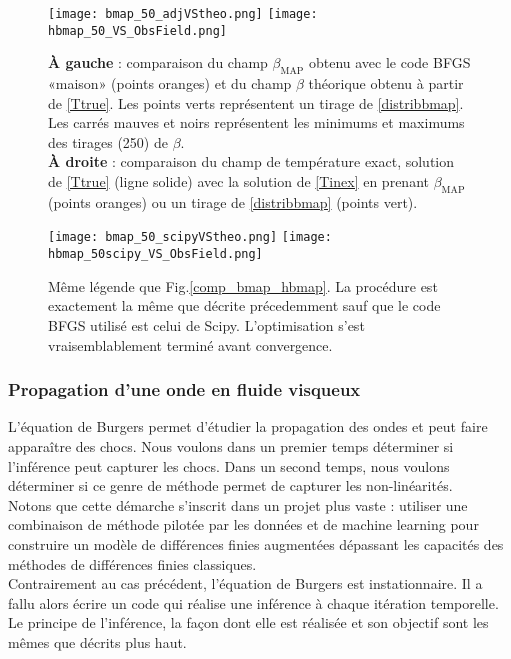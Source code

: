 \documentclass[a4paper,12pt]{article}
\newcommand{\bmap}{\beta_{\text{MAP}}}
\newcommand\bk{\color{black}}
\newcommand\dsb{\color{dsb}}
\numberwithin{equation}{section} %
\begin{document}
\begin{figure}[!ht]
\centering
\texttt{[image: bmap\_50\_adjVStheo.png]} \hfill
\texttt{[image: hbmap\_50\_VS\_ObsField.png]}
\caption{\small{\textbf{À gauche} : comparaison du champ $\bmap$ obtenu avec le code BFGS «maison» (points oranges) et du champ $\beta$ théorique obtenu à partir de \eqref{Ttrue}. Les points verts représentent un tirage de \eqref{distribbmap}. Les carrés mauves et noirs représentent les minimums et maximums des tirages (250) de $\beta$. \\ \textbf{À droite} : comparaison du champ de température exact, solution de \eqref{Ttrue} (ligne solide) avec la solution de \eqref{Tinex} en prenant $\bmap$ (points oranges) ou un tirage de \eqref{distribbmap} (points vert).}}
\label{comp_bmap_hbmap}
\end{figure}

\begin{figure}[!ht]
\centering
\texttt{[image: bmap\_50\_scipyVStheo.png]} \hfill
\texttt{[image: hbmap\_50scipy\_VS\_ObsField.png]}
\caption{\small{Même légende que Fig.\eqref{comp_bmap_hbmap}. La procédure est exactement la même que décrite précedemment sauf que le code BFGS utilisé est celui de Scipy. L'optimisation s'est vraisemblablement terminé avant convergence.}}
\label{scipycomp_bmap_hbmap}
\end{figure}

 
 
\dsb \subsubsection{Propagation d'une onde en fluide visqueux} \bk
L'équation de Burgers permet d'étudier la propagation des ondes et peut faire apparaître des chocs. Nous voulons dans un premier temps déterminer si l'inférence peut capturer les chocs. Dans un second temps, nous voulons déterminer si ce genre de méthode permet de capturer les non-linéarités. \\
Notons que cette démarche s'inscrit dans un projet plus vaste : utiliser une combinaison de méthode pilotée par les données et de machine learning pour construire un modèle de différences finies augmentées dépassant les capacités des méthodes de différences finies classiques.\\

\noindent Contrairement au cas précédent, l'équation de Burgers est instationnaire. Il a fallu alors écrire un code qui réalise une inférence à chaque itération temporelle. Le principe de l'inférence, la façon dont elle est réalisée et son objectif sont les mêmes que décrits plus haut.\\
\end{document}
